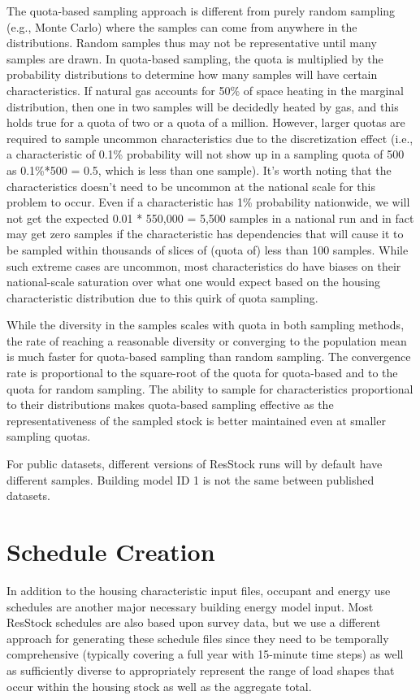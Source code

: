 The quota-based sampling approach is different from purely random sampling (e.g., Monte Carlo) where the samples can come from anywhere in the distributions. Random samples thus may not be representative until many samples are drawn. In quota-based sampling, the quota is multiplied by the probability distributions to determine how many samples will have certain characteristics. If natural gas accounts for 50\% of space heating in the marginal distribution, then one in two samples will be decidedly heated by gas, and this holds true for a quota of two or a quota of a million. However, larger quotas are required to sample uncommon characteristics due to the discretization effect (i.e., a characteristic of 0.1\% probability will not show up in a sampling quota of 500 as 0.1\%*500 = 0.5, which is less than one sample). It's worth noting that the characteristics doesn't need to be uncommon at the national scale for this problem to occur. Even if a characteristic has 1\% probability nationwide, we will not get the expected 0.01 * 550,000 = 5,500 samples in a national run and in fact may get zero samples if the characteristic has dependencies that will cause it to be sampled within thousands of slices of (quota of) less than 100 samples. While such extreme cases are uncommon, most characteristics do have biases on their national-scale saturation over what one would expect based on the housing characteristic distribution due to this quirk of quota sampling. 

While the diversity in the samples scales with quota in both sampling methods, the rate of reaching a reasonable diversity or converging to the population mean is much faster for quota-based sampling than random sampling. The convergence rate is proportional to the square-root of the quota for quota-based and to the quota for random sampling. The ability to sample for characteristics proportional to their distributions makes quota-based sampling effective as the representativeness of the sampled stock is better maintained even at smaller sampling quotas.

For public datasets, different versions of ResStock runs will by default have different samples. Building model ID 1 is not the same between published datasets.

\section{Schedule Creation}\label{occupancy_model}
In addition to the housing characteristic input files, occupant and energy use schedules are another major necessary building energy model input. Most ResStock schedules are also based upon survey data, but we use a different approach for generating these schedule files since they need to be temporally comprehensive (typically covering a full year with 15-minute time steps) as well as sufficiently diverse to appropriately represent the range of load shapes that occur within the housing stock as well as the aggregate total.

